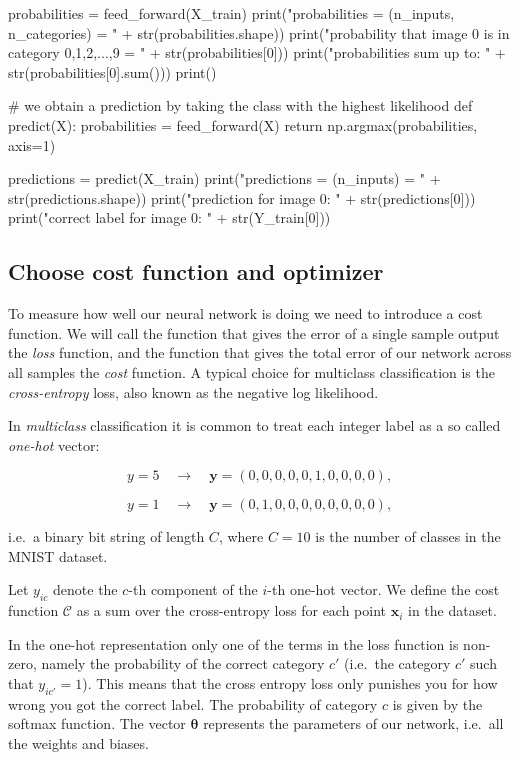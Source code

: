 \documentclass[%
oneside,                 %
final,                   %
10pt]{article}
\begin{document}
probabilities = feed_forward(X_train)
print("probabilities = (n_inputs, n_categories) = " + str(probabilities.shape))
print("probability that image 0 is in category 0,1,2,...,9 = \n" + str(probabilities[0]))
print("probabilities sum up to: " + str(probabilities[0].sum()))
print()

# we obtain a prediction by taking the class with the highest likelihood
def predict(X):
    probabilities = feed_forward(X)
    return np.argmax(probabilities, axis=1)

predictions = predict(X_train)
print("predictions = (n_inputs) = " + str(predictions.shape))
print("prediction for image 0: " + str(predictions[0]))
print("correct label for image 0: " + str(Y_train[0]))

\epycod


\subsection{Choose cost function and optimizer}

To measure how well our neural network is doing we need to introduce a cost function.  
We will call the function that gives the error of a single sample output the \emph{loss} function, and the function
that gives the total error of our network across all samples the \emph{cost} function.
A typical choice for multiclass classification is the \emph{cross-entropy} loss, also known as the negative log likelihood.  

In \emph{multiclass} classification it is common to treat each integer label as a so called \emph{one-hot} vector:  

$$ y = 5 \quad \rightarrow \quad \bm{y} = (0, 0, 0, 0, 0, 1, 0, 0, 0, 0) ,$$  

$$ y = 1 \quad \rightarrow \quad \bm{y} = (0, 1, 0, 0, 0, 0, 0, 0, 0, 0) ,$$  


i.e.~a binary bit string of length $C$, where $C = 10$ is the number of classes in the MNIST dataset.  

Let $y_{ic}$ denote the $c$-th component of the $i$-th one-hot vector.  
We define the cost function $\mathcal{C}$ as a sum over the cross-entropy loss for each point $\bm{x}_i$ in the dataset.

In the one-hot representation only one of the terms in the loss function is non-zero, namely the
probability of the correct category $c'$  
(i.e.~the category $c'$ such that $y_{ic'} = 1$). This means that the cross entropy loss only punishes you for how wrong
you got the correct label. The probability of category $c$ is given by the softmax function. The vector $\bm{\theta}$ represents the parameters of our network, i.e.~all the weights and biases.  
\end{document}
